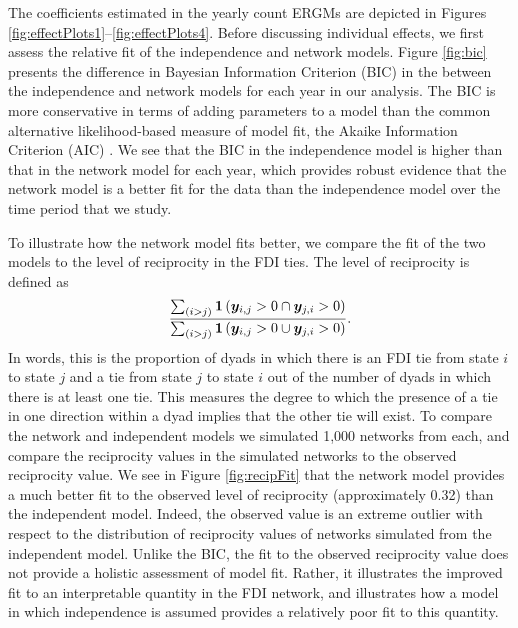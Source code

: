 \documentclass[reqno,onecolumn,letterpaper,12pt]{article}
\begin{document}
The coefficients estimated in the yearly count ERGMs are depicted in Figures \ref{fig:effectPlots1}--\ref{fig:effectPlots4}. Before discussing individual effects, we first assess the relative fit of the independence and network models. Figure \ref{fig:bic} presents the difference in Bayesian Information Criterion (BIC) in the between the independence and network models for each year in our analysis. The BIC is more conservative in terms of adding parameters to a model than the common alternative likelihood-based measure of model fit, the Akaike Information Criterion (AIC) \citep{waldorp2005model,abrahamowicz1990optimal,raftery1999bayes}. We see that the BIC in the independence model is higher than that in the network model for each year, which provides robust evidence that the network model is a better fit for the data than the independence model over the time period that we study. 

To illustrate how the network model fits better, we compare the fit of the two models to the level of reciprocity in the FDI ties. The level of reciprocity is defined as $$ \frac{ \sum_{(i>j)} \text{\bf 1}\left( \bm{y}_{i,j}>0  \cap \bm{y}_{j,i}>0 \right)}{ \sum_{(i>j)} \text{\bf 1}\left( \bm{y}_{i,j}>0  \cup \bm{y}_{j,i}>0 \right)}.$$ In words, this is the proportion of dyads in which there is an FDI tie from state $i$ to state $j$ and a tie from state $j$ to state $i$ out of the number of dyads in which there is at least one tie. This measures the degree to which the presence of a tie in one direction within a dyad implies that the other tie will exist. To compare the network and independent models we simulated 1,000 networks from each, and compare the reciprocity values in the simulated networks to the observed reciprocity value. We see in Figure \ref{fig:recipFit} that the network model provides a much better fit to the observed level of reciprocity (approximately 0.32) than the independent model. Indeed, the observed value is an extreme outlier with respect to the distribution of reciprocity values of networks simulated from the independent model. Unlike the BIC, the fit to the observed reciprocity value does not provide a holistic assessment of model fit. Rather, it illustrates the improved fit to an interpretable quantity in the FDI network, and illustrates how a model in which independence is assumed provides a relatively poor fit to this quantity.
\end{document}
